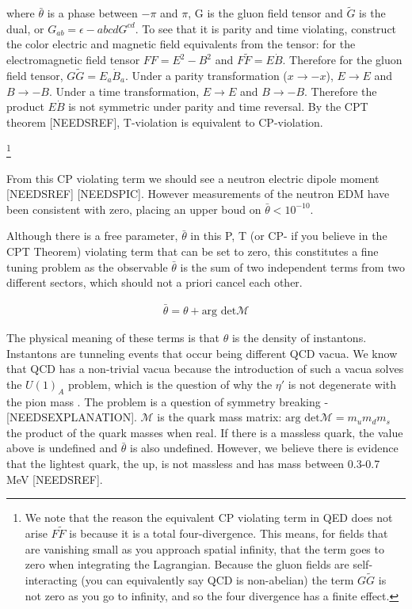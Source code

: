 \documentclass[12pt,twosides]{book}
\begin{document}
where $\bar \theta$ is a phase between $-\pi$ and $\pi$, G is the gluon field tensor and $\tilde G$ is the dual, or $G_{ab} = \epsilon-{abcd} G^{cd}$. To see that it is parity and time violating, construct the color electric and magnetic field equivalents from the tensor: for the electromagnetic field tensor $FF = E^2 -B^2$ and $F\tilde F = E\dot B$. Therefore for the gluon field tensor, $G\tilde G = E_a \dot B_a$. Under a parity transformation ($x \rightarrow -x$), $E \rightarrow E$ and $B \rightarrow -B$. Under a time transformation, $
E \rightarrow E$ and $B \rightarrow -B$.  Therefore the product $E\dot B$ is not symmetric under parity and time reversal. By the CPT theorem [NEEDSREF], T-violation is equivalent to CP-violation.

\footnote{We note that the reason the equivalent CP violating term in QED does not arise $F\tilde F$ is because it is a total four-divergence. This means, for fields that are vanishing small as you approach spatial infinity, that the term goes to zero when integrating the Lagrangian. Because the gluon fields are self-interacting (you can equivalently say QCD is non-abelian) the term $G \tilde G$ is not zero as you go to infinity, and so the four divergence has a finite effect.}

 From this CP violating term we should see a neutron electric dipole moment [NEEDSREF] [NEEDSPIC]. However measurements of the neutron EDM have been consistent with zero, placing an upper boud on $\bar \theta < 10^{-10}$.

Although there is a free parameter, $\bar \theta$ in this P, T (or CP- if you believe in the CPT Theorem) violating term that can be set to zero, this constitutes a fine tuning problem as the observable $\bar \theta$ is the sum of two independent terms from two different sectors, which should not a priori cancel each other.

\begin{align*}
\bar \theta = \theta + \text{arg det} \mathcal{M}
\end{align*}

The physical meaning of these terms is that $\theta$ is the density of instantons. Instantons are tunneling events that occur being different QCD vacua. We know that QCD has a non-trivial vacua because the introduction of such a vacua solves the $U(1)_A$ problem, which is the question of why the $\eta'$ is not degenerate with the pion mass \cite{thooft76}. The problem is a question of symmetry breaking - [NEEDSEXPLANATION]. $\mathcal{M}$ is the quark mass matrix: $\text{arg det} \mathcal{M} = m_um_dm_s$ the product of the quark masses when real. If there is a massless quark, the value above is undefined and $\bar \theta$ is also undefined. However, we believe there is evidence that the lightest quark, the up, is not massless and has mass between 0.3-0.7 MeV [NEEDSREF].
\end{document}
